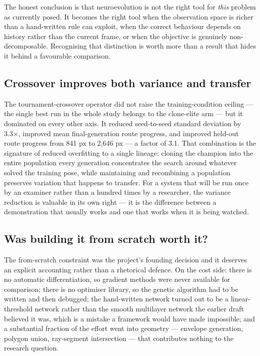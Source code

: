 \documentclass[conference]{IEEEtran}
\begin{document}
The honest conclusion is that neuroevolution is not the right tool for \emph{this} problem as currently posed. It becomes the right tool when the observation space is richer than a hand-written rule can exploit, when the correct behaviour depends on history rather than the current frame, or when the objective is genuinely non-decomposable. Recognising that distinction is worth more than a result that hides it behind a favourable comparison.

\subsection{Crossover improves both variance and transfer}

The tournament-crossover operator did not raise the training-condition ceiling — the single best run in the whole study belongs to the clone-elite arm — but it dominated on every other axis. It reduced seed-to-seed standard deviation by 3.3×, improved mean final-generation route progress, and improved held-out route progress from 841 px to 2,646 px — a factor of 3.1. That combination is the signature of reduced overfitting to a single lineage: cloning the champion into the entire population every generation concentrates the search around whatever solved the training pose, while maintaining and recombining a population preserves variation that happens to transfer. For a system that will be run once by an examiner rather than a hundred times by a researcher, the variance reduction is valuable in its own right — it is the difference between a demonstration that usually works and one that works when it is being watched.

\subsection{Was building it from scratch worth it?}

The from-scratch constraint was the project's founding decision and it deserves an explicit accounting rather than a rhetorical defence. On the cost side: there is no automatic differentiation, so gradient methods were never available for comparison; there is no optimiser library, so the genetic algorithm had to be written and then debugged; the hand-written network turned out to be a linear-threshold network rather than the smooth multilayer network the earlier draft believed it was, which is a mistake a framework would have made impossible; and a substantial fraction of the effort went into geometry — envelope generation, polygon union, ray-segment intersection — that contributes nothing to the research question.
\end{document}

